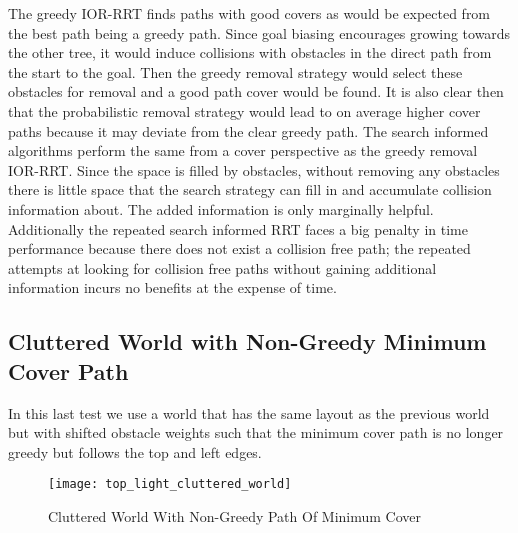 The greedy IOR-RRT finds paths with good covers as would be expected from the best path being a greedy path. Since goal biasing encourages growing towards the other tree, it would induce collisions with obstacles in the direct path from the start to the goal. Then the greedy removal strategy would select these obstacles for removal and a good path cover would be found. It is also clear then that the probabilistic removal strategy would lead to on average higher cover paths because it may deviate from the clear greedy path. The search informed algorithms perform the same from a cover perspective as the greedy removal IOR-RRT. Since the space is filled by obstacles, without removing any obstacles there is little space that the search strategy can fill in and accumulate collision information about. The added information is only marginally helpful. Additionally the repeated search informed RRT faces a big penalty in time performance because there does not exist a collision free path; the repeated attempts at looking for collision free paths without gaining additional information incurs no benefits at the expense of time.



\subsection{Cluttered World with Non-Greedy Minimum Cover Path}
In this last test we use a world that has the same layout as the previous world but with shifted obstacle weights such that the minimum cover path is no longer greedy but follows the top and left edges. 

\begin{figure}[h!]
    \centering
    \texttt{[image: top\_light\_cluttered\_world]}
    \caption{Cluttered World With Non-Greedy Path Of Minimum Cover}
    \label{fig:top_light_cluttered_world}
\end{figure}


